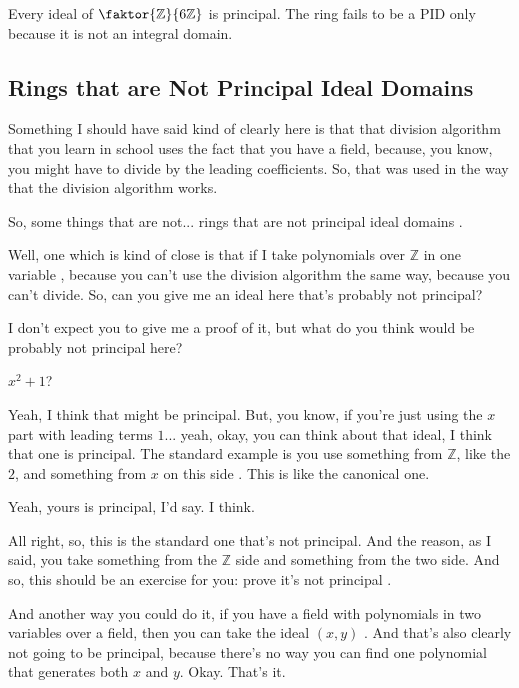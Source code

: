 \begin{aiNote}
Every ideal of $\faktor{\mathbb{Z}}{6\mathbb{Z}}$ is principal. The ring fails to be a PID only because it is not an integral domain.
\end{aiNote}

\subsection{Rings that are Not Principal Ideal Domains}

\begin{speech}[00:41:37 - 00:41:50]
Something I should have said kind of clearly here is that that division algorithm that you learn in school uses the fact that you have a field, because, you know, you might have to divide by the leading coefficients. So, that was used in the way that the division algorithm works.

So, some things that are not... rings that are not principal ideal domains .

Well, one which is kind of close is that if I take polynomials over $\mathbb{Z}$ in one variable , because you can't use the division algorithm the same way, because you can't divide. So, can you give me an ideal here that's probably not principal?

I don't expect you to give me a proof of it, but what do you think would be probably not principal here?
\end{speech}

\begin{student}
$x^2 + 1$?
\end{student}

\begin{speech}[00:41:52 - 00:42:03]
Yeah, I think that might be principal. But, you know, if you're just using the $x$ part with leading terms $1$... yeah, okay, you can think about that ideal, I think that one is principal. The standard example is you use something from $\mathbb{Z}$, like the $2$, and something from $x$ on this side . This is like the canonical one.

Yeah, yours is principal, I'd say. I think.

All right, so, this is the standard one that's not principal. And the reason, as I said, you take something from the $\mathbb{Z}$ side and something from the two side. And so, this should be an exercise for you: prove it's not principal .

And another way you could do it, if you have a field with polynomials in two variables over a field, then you can take the ideal $(x, y)$ . And that's also clearly not going to be principal, because there's no way you can find one polynomial that generates both $x$ and $y$. Okay. That's it. 
\end{speech}

